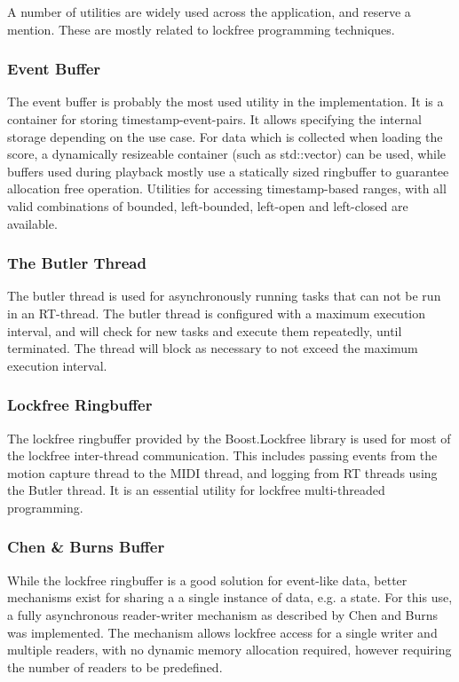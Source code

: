 A number of utilities are widely used across the application,
and reserve a mention.
These are mostly related to lockfree programming techniques.

\subsubsection*{Event Buffer}

The event buffer is probably the most used utility in the implementation.
It is a container for storing timestamp-event-pairs.
It allows specifying the internal storage depending on the use case.
For data which is collected when loading the score,
a dynamically resizeable container (such as std::vector) can be used,
while buffers used during playback mostly use a statically sized ringbuffer
to guarantee allocation free operation.
Utilities for accessing timestamp-based ranges,
with all valid combinations of
bounded, left-bounded, left-open and left-closed are available.

\subsubsection*{The Butler Thread}

The butler thread is used for asynchronously running
tasks that can not be run in an RT-thread.
The butler thread is configured with a maximum execution interval,
and will check for new tasks and execute them repeatedly,
until terminated.
The thread will block as necessary to not exceed the
maximum execution interval.

\subsubsection*{Lockfree Ringbuffer}

The lockfree ringbuffer provided by the Boost.Lockfree library \cite{required?}
is used for most of the lockfree inter-thread communication.
This includes passing events from the motion capture thread
to the MIDI thread, and logging from RT threads using the Butler thread.
It is an essential utility for lockfree multi-threaded programming.

\subsubsection*{Chen \& Burns Buffer}

While the lockfree ringbuffer is a good solution
for event-like data,
better mechanisms exist for sharing a a single
instance of data, e.g. a state. 
For this use, a fully asynchronous reader-writer mechanism
as described by Chen and Burns \cite{Chen97} was implemented.
The mechanism allows lockfree access for
a single writer and multiple readers,
with no dynamic memory allocation required,
however requiring the number of readers to be predefined.

